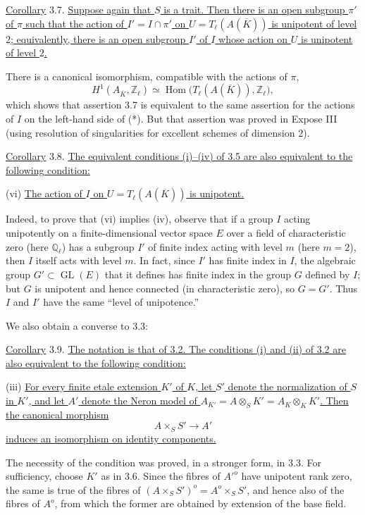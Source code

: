 \medskip
\noindent
\underline{Corollary} 3.7. \underline{Suppose again that $S$ is a trait.
Then there is an open subgroup $\pi'$ of $\pi$ such that the action of
$I'=I\cap\pi'$ on $U=T_\ell(A(\overline K))$ is unipotent of level $2$;
equivalently, there is an open subgroup $I'$ of $I$ whose action on $U$ is
unipotent of level $2$.}

There is a canonical isomorphism, compatible with the actions of $\pi$,
\begin{equation}\tag{*}
 H^1(A_{\overline K},\mathbb Z_\ell)
 \simeq
 \operatorname{Hom}\bigl(T_\ell(A(\overline K)),\mathbb Z_\ell\bigr),
\end{equation}
which shows that assertion 3.7 is equivalent to the same assertion for
the actions of $I$ on the left-hand side of (*).  But that assertion was
proved in Expose III (using resolution of singularities for excellent
schemes of dimension $2$).

\medskip
\noindent
\underline{Corollary} 3.8. \underline{The equivalent conditions (i)--(iv)
of 3.5 are also equivalent to the following condition:}

\smallskip
\noindent
(vi) \quad \underline{The action of $I$ on
$U=T_\ell(A(\overline K))$ is unipotent.}

Indeed, to prove that (vi) implies (iv), observe that if a group $I$
acting unipotently on a finite-dimensional vector space $E$ over a field
of characteristic zero (here $\mathbb Q_\ell$) has a subgroup $I'$ of
finite index acting with level $m$ (here $m=2$), then $I$ itself acts with
level $m$.  In fact, since $I'$ has finite index in $I$, the algebraic
group $G'\subset\operatorname{GL}(E)$ that it defines has finite index in
the group $G$ defined by $I$; but $G$ is unipotent and hence connected (in
characteristic zero), so $G=G'$.  Thus $I$ and $I'$ have the same
``level of unipotence.''

We also obtain a converse to 3.3:

\medskip
\noindent
\underline{Corollary} 3.9. \underline{The notation is that of 3.2.  The
conditions (i) and (ii) of 3.2 are also equivalent to the following
condition:}

\smallskip
\noindent
(iii) \quad \underline{For every finite etale extension $K'$ of $K$, let
$S'$ denote the normalization of $S$ in $K'$, and let $A'$ denote the
Neron model of
$A_{K'}=A\otimes_SK'=A_K\otimes_KK'$.  Then the canonical morphism}
\[
 A\times_SS'\longrightarrow A'
\]
\underline{induces an isomorphism on identity components.}

The necessity of the condition was proved, in a stronger form, in 3.3.
For sufficiency, choose $K'$ as in 3.6.  Since the fibres of ${A'}^o$ have
unipotent rank zero, the same is true of the fibres of
$(A\times_SS')^o=A^o\times_SS'$, and hence also of the fibres of $A^o$,
from which the former are obtained by extension of the base field.
